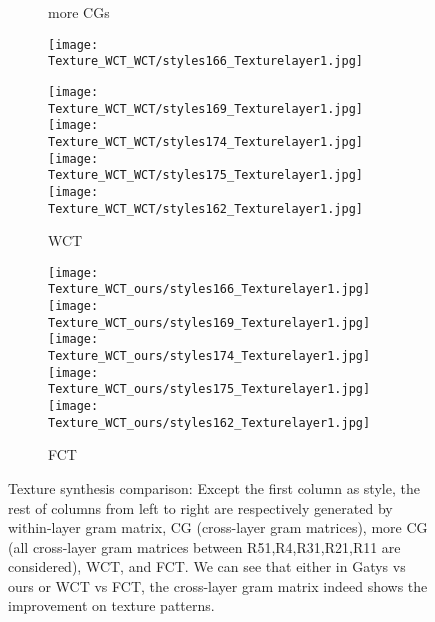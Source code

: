 \documentclass[runningheads]{llncs}
\begin{document}
\begin{figure*}[!htbp]
\begin{subfigure}[t]{0.15\textwidth}
    \caption{more CGs}
\end{subfigure}

\begin{subfigure}[t]{0.153\textwidth}
	
	\texttt{[image: Texture\_WCT\_WCT/styles166\_Texturelayer1.jpg]}

	\texttt{[image: Texture\_WCT\_WCT/styles169\_Texturelayer1.jpg]}
	\texttt{[image: Texture\_WCT\_WCT/styles174\_Texturelayer1.jpg]}
	\texttt{[image: Texture\_WCT\_WCT/styles175\_Texturelayer1.jpg]}
    \texttt{[image: Texture\_WCT\_WCT/styles162\_Texturelayer1.jpg]}
    \caption{WCT}
\end{subfigure}
\begin{subfigure}[t]{0.153\textwidth}
	
	\texttt{[image: Texture\_WCT\_ours/styles166\_Texturelayer1.jpg]}
	\texttt{[image: Texture\_WCT\_ours/styles169\_Texturelayer1.jpg]}
	\texttt{[image: Texture\_WCT\_ours/styles174\_Texturelayer1.jpg]}
	\texttt{[image: Texture\_WCT\_ours/styles175\_Texturelayer1.jpg]}
    \texttt{[image: Texture\_WCT\_ours/styles162\_Texturelayer1.jpg]}
    \caption{FCT}
\end{subfigure}
\caption{Texture synthesis comparison: Except the first column as
  style, the rest of columns from left to right are respectively generated by
  within-layer gram matrix, CG (cross-layer gram matrices), more CG (all cross-layer gram matrices between R51,R4,R31,R21,R11 are considered), WCT, and FCT. We can see that
  either in Gatys vs ours or WCT vs FCT, the cross-layer gram
  matrix indeed shows the improvement on texture patterns. }
\label{fig:texture}
\end{figure*}



{\small


}
\end{document}
